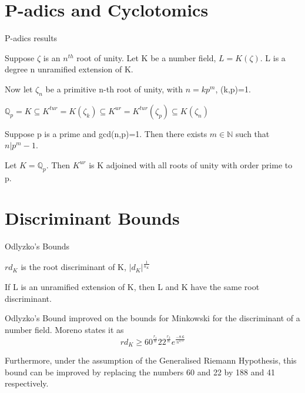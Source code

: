 \documentclass[10pt]{beamer}
\theoremstyle{plain} %
\begin{document}
\section{P-adics and Cyclotomics}

\begin{frame}{P-adics results}
\pause

\begin{theorem}
   Suppose $\zeta$ is an $n^{th}$ root of unity. Let K be a number field, $L=K(\zeta)$. 
L is a degree n unramified extension of K. 
\end{theorem}
\pause

Now let $\zeta_n$ be a primitive n-th root of unity, with $n=kp^{m}$, (k,p)=1.
\pause
\begin{example}
      $\mathbb{Q}_{p}=K\subseteq K^{tur}=K(\zeta_k)\subseteq K^{ur} = K^{tur}(\zeta_{p})\subseteq K(\zeta_n)$
\end{example}
\pause

\begin{lemma}
Suppose p is a prime and gcd(n,p)=1. Then there exists $m\in\mathbb{N}$ such that $n|p^m-1$.
\end{lemma}
\pause

\begin{theorem}
    Let $K=\mathbb{Q}_p$. Then $K^{ur}$ is K adjoined with all roots of unity with order prime to p. 
\end{theorem}

\end{frame}

\section{Discriminant Bounds}

\begin{frame}{Odlyzko's Bounds}
\pause

\begin{definition}
$rd_K$ is the root discriminant of K, $|d_K|^\frac{1}{n_K}$
\end{definition}
\pause

\begin{lemma}
 If L is an unramified extension of K, then L and K have the same root discriminant.
\end{lemma}
\pause

    Odlyzko's Bound improved on the bounds for Minkowski for the discriminant of a number field. Moreno states it as  
\begin{equation}
rd_K\geqslant 60^{\frac{r_1}{n}}22^{\frac{r_2}{n}}e^\frac{-8.6}{n^{2/3}}
\end{equation}
\pause

Furthermore, under the assumption of the Generalised Riemann Hypothesis, 
this bound can be improved by replacing the numbers 60 and 22 by 188 and 41 respectively. 
\end{frame}
\end{document}

